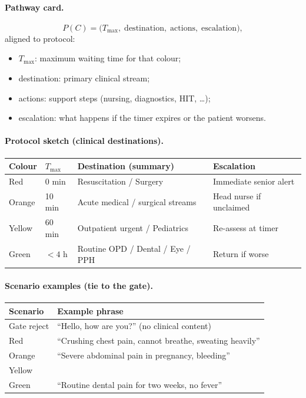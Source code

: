 \paragraph{Pathway card.}
\begin{equation}
  P(C) = \bigl(T_{\max},\;\mathrm{destination},\;\mathrm{actions},\;\mathrm{escalation}\bigr),
\end{equation}
aligned to \examplehospital{} protocol:
\begin{itemize}
  \item \(T_{\max}\): maximum waiting time for that colour;
  \item destination: primary clinical stream;
  \item actions: support steps (nursing, diagnostics, HIT, \ldots);
  \item escalation: what happens if the timer expires or the patient worsens.
\end{itemize}

\paragraph{Protocol sketch (clinical destinations).}
\begin{center}
\footnotesize
\begin{tabular}{@{}llll@{}}
\toprule
Colour & \(T_{\max}\) & Destination (summary) & Escalation \\
\midrule
Red & 0 min & Resuscitation / Surgery & Immediate senior alert \\
Orange & 10 min & Acute medical / surgical streams & Head nurse if unclaimed \\
Yellow & 60 min & Outpatient urgent / Pediatrics & Re-assess at timer \\
Green & \(<4\) h & Routine OPD / Dental / Eye / PPH & Return if worse \\
\bottomrule
\end{tabular}
\end{center}

\paragraph{Scenario examples (tie to the gate).}
\begin{center}
\footnotesize
\begin{tabular}{@{}lp{9cm}@{}}
\toprule
Scenario & Example phrase \\
\midrule
Gate reject & ``Hello, how are you?'' (no clinical content) \\
Red & ``Crushing chest pain, cannot breathe, sweating heavily'' \\
Orange & ``Severe abdominal pain in pregnancy, bleeding'' \\
Yellow & \runningcomplaint{} \\
Green & ``Routine dental pain for two weeks, no fever'' \\
\bottomrule
\end{tabular}
\end{center}

